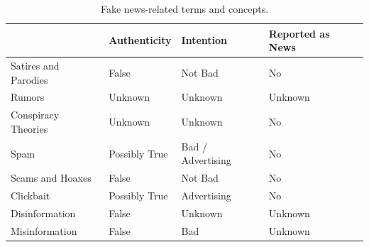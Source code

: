 \documentclass{ieeeaccess}
\begin{document}

\begin{table}[!h]
\centering
\caption{Fake news-related terms and concepts.}
\label{tab:comp}
\footnotesize
\begin{tabular}{|M{.20\columnwidth}|M{.20\columnwidth}|M{.20\columnwidth}|M{.20\columnwidth}|}
 & \textbf{Authenticity}  & \textbf{Intention} & \textbf{Reported as News}  \\ 
\hline 
Satires and Parodies      & False                  & Not Bad          & No               \\ 
\hline
Rumors       & Unknown           & Unknown      & Unknown      \\ 
\hline
Conspiracy Theories & Unknown           & Unknown      & No               \\ 
\hline
Spam                   & Possibly True   & Bad / Advertising & No               \\ 
\hline
Scams and Hoaxes      & False        & Not Bad          & No               \\ 
\hline
Clickbait           & Possibly True   & Advertising      & No               \\ 
\hline
Disinformation         & False                  & Unknown      & Unknown      \\ 
\hline
Misinformation         & False                  & Bad              & Unknown     \\
\hline
\end{tabular}
\end{table}
\end{document}
